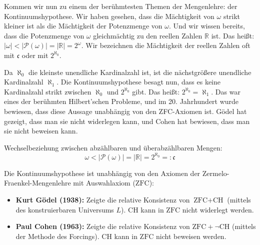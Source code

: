 \begin{spoken-clean}[01:03:23 - 01:05:20]
Kommen wir nun zu einem der berühmtesten Themen der Mengenlehre: der Kontinuumshypothese. Wir haben gesehen, dass die Mächtigkeit von $\omega$ strikt kleiner ist als die Mächtigkeit der Potenzmenge von $\omega$. Und wir wissen bereits, dass die Potenzmenge von $\omega$ gleichmächtig zu den reellen Zahlen $\mathbb{R}$ ist. Das heißt: $|\omega| < |\mathcal{P}(\omega)| = |\mathbb{R}| = 2^\omega$. Wir bezeichnen die Mächtigkeit der reellen Zahlen oft mit $\mathfrak{c}$ oder mit $2^{\aleph_0}$.
\end{spoken-clean}

\begin{spoken-clean}[01:05:20 - 01:07:21]
Da $\aleph_0$ die kleinste unendliche Kardinalzahl ist, ist die nächstgrößere unendliche Kardinalzahl $\aleph_1$. Die Kontinuumshypothese besagt nun, dass es keine Kardinalzahl strikt zwischen $\aleph_0$ und $2^{\aleph_0}$ gibt. Das heißt: $2^{\aleph_0} = \aleph_1$. Das war eines der berühmten Hilbert'schen Probleme, und im 20. Jahrhundert wurde bewiesen, dass diese Aussage unabhängig von den ZFC-Axiomen ist. Gödel hat gezeigt, dass man sie nicht widerlegen kann, und Cohen hat bewiesen, dass man sie nicht beweisen kann.
\end{spoken-clean}

\begin{math-stroke}
Wechselbeziehung zwischen abzählbaren und überabzählbaren Mengen:
\[
\omega < |\mathcal{P}(\omega)| = |\mathbb{R}| = 2^{\aleph_0} =: \mathfrak{c}
\]


\begin{explanation-of-steps}
Die Kontinuumshypothese ist unabhängig von den Axiomen der Zermelo-Fraenkel-Mengenlehre mit Auswahlaxiom ($\text{ZFC}$):
\begin{itemize}
    \item \textbf{Kurt Gödel (1938):} Zeigte die relative Konsistenz von $\text{ZFC} + \text{CH}$ (mittels des konstruierbaren Universums $L$). $\text{CH}$ kann in $\text{ZFC}$ nicht widerlegt werden.
    \item \textbf{Paul Cohen (1963):} Zeigte die relative Konsistenz von $\text{ZFC} + \neg\text{CH}$ (mittels der Methode des Forcings). $\text{CH}$ kann in $\text{ZFC}$ nicht beweisen werden.
\end{itemize}
\end{explanation-of-steps}
\end{math-stroke}

